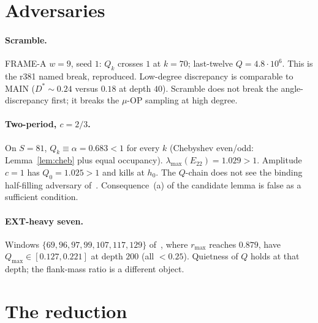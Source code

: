 \documentclass[11pt]{article}
\theoremstyle{remark}
\begin{document}
\section{Adversaries}\label{sec:adv}

\paragraph{Scramble.}
FRAME-A $w=9$, seed $1$: $Q_k$ crosses $1$ at $k=70$; last-twelve
$Q=4.8\cdot10^6$.  This is the r381 named break, reproduced.
Low-degree discrepancy is comparable to MAIN ($D^*\sim 0.24$
versus $0.18$ at depth $40$).  Scramble does not break the
angle-discrepancy first; it breaks the $\mu$-OP sampling at
high degree.

\paragraph{Two-period, $c=2/3$.}
On $S=81$, $Q_k\equiv\alpha=0.683<1$ for every $k$ (Chebyshev
even/odd: Lemma~\ref{lem:cheb} plus equal occupancy).
$\lambda_{\max}(E_{22})=1.029>1$.  Amplitude $c=1$ has $Q_0=1.025>1$
and kills at $h_0$.  The $Q$-chain does not see the binding
half-filling adversary of~\cite{r382}.  Consequence~(a) of the
candidate lemma is false as a sufficient condition.

\paragraph{EXT-heavy seven.}
Windows $\{69,96,97,99,107,117,129\}$ of~\cite{r382}, where
$r_{\max}$ reaches $0.879$, have $Q_{\max}\in[0.127,0.221]$ at
depth $200$ (all $<0.25$).  Quietness of $Q$ holds at that
depth; the flank-mass ratio is a different object.

\section{The reduction}\label{sec:red}
\end{document}
